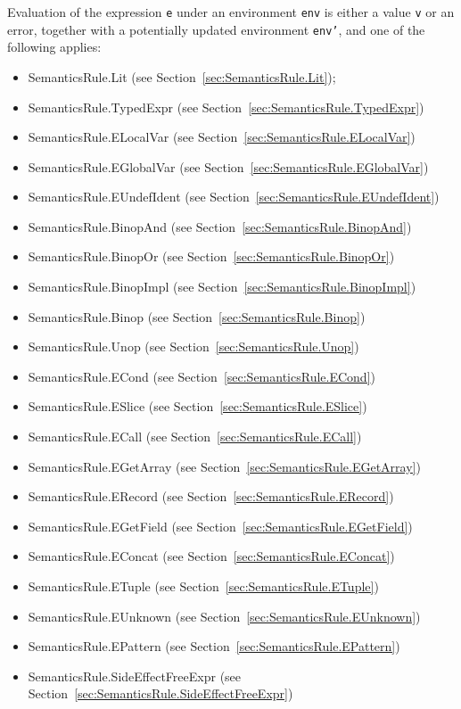 \documentclass{book}
\begin{document}
Evaluation of the expression \texttt{e} under an environment \texttt{env} is
either a value \texttt{v} or an error, together with a potentially updated
environment \texttt{env'}, and one of the following applies:
\begin{itemize}
\item SemanticsRule.Lit (see Section~\ref{sec:SemanticsRule.Lit});
\item SemanticsRule.TypedExpr (see Section~\ref{sec:SemanticsRule.TypedExpr})
\item SemanticsRule.ELocalVar (see Section~\ref{sec:SemanticsRule.ELocalVar})
\item SemanticsRule.EGlobalVar (see Section~\ref{sec:SemanticsRule.EGlobalVar})
\item SemanticsRule.EUndefIdent (see Section~\ref{sec:SemanticsRule.EUndefIdent})
\item SemanticsRule.BinopAnd (see Section~\ref{sec:SemanticsRule.BinopAnd})
\item SemanticsRule.BinopOr (see Section~\ref{sec:SemanticsRule.BinopOr})
\item SemanticsRule.BinopImpl (see Section~\ref{sec:SemanticsRule.BinopImpl})
\item SemanticsRule.Binop (see Section~\ref{sec:SemanticsRule.Binop})
\item SemanticsRule.Unop (see Section~\ref{sec:SemanticsRule.Unop})
\item SemanticsRule.ECond (see Section~\ref{sec:SemanticsRule.ECond})
\item SemanticsRule.ESlice (see Section~\ref{sec:SemanticsRule.ESlice})
\item SemanticsRule.ECall (see Section~\ref{sec:SemanticsRule.ECall})
\item SemanticsRule.EGetArray (see Section~\ref{sec:SemanticsRule.EGetArray})
\item SemanticsRule.ERecord (see Section~\ref{sec:SemanticsRule.ERecord})
\item SemanticsRule.EGetField (see Section~\ref{sec:SemanticsRule.EGetField})
\item SemanticsRule.EConcat (see Section~\ref{sec:SemanticsRule.EConcat})
\item SemanticsRule.ETuple (see Section~\ref{sec:SemanticsRule.ETuple})
\item SemanticsRule.EUnknown (see Section~\ref{sec:SemanticsRule.EUnknown})
\item SemanticsRule.EPattern (see Section~\ref{sec:SemanticsRule.EPattern})
\item SemanticsRule.SideEffectFreeExpr (see Section~\ref{sec:SemanticsRule.SideEffectFreeExpr})

\end{itemize}
\end{document}
